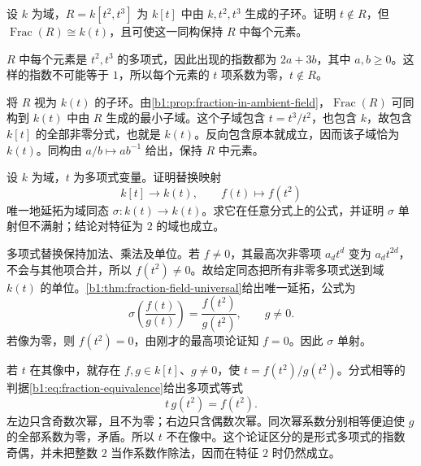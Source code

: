 \begin{exercise}\label{b1:ex:13-1}
	设 \(k\) 为域，\(R=k[t^2,t^3]\) 为 \(k[t]\) 中由 \(k,t^2,t^3\) 生成的子环。证明 \(t\notin R\)，但 \(\operatorname{Frac}(R)\cong k(t)\)，且可使这一同构保持 \(R\) 中每个元素。
\end{exercise}
\begin{solution}
	\(R\) 中每个元素是 \(t^2,t^3\) 的多项式，因此出现的指数都为 \(2a+3b\)，其中 \(a,b\geq0\)。这样的指数不可能等于 \(1\)，所以每个元素的 \(t\) 项系数为零，\(t\notin R\)。

	将 \(R\) 视为 \(k(t)\) 的子环。由\cref{b1:prop:fraction-in-ambient-field}，\(\operatorname{Frac}(R)\) 可同构到 \(k(t)\) 中由 \(R\) 生成的最小子域。这个子域包含 \(t=t^3/t^2\)，也包含 \(k\)，故包含 \(k[t]\) 的全部非零分式，也就是 \(k(t)\)。反向包含原本就成立，因而该子域恰为 \(k(t)\)。同构由 \(a/b\mapsto ab^{-1}\) 给出，保持 \(R\) 中元素。
\end{solution}

\begin{exercise}\label{b1:ex:13-9}
	设 \(k\) 为域，\(t\) 为多项式变量。证明替换映射
	\[
		k[t]\longrightarrow k(t),\qquad f(t)\longmapsto f(t^2)
	\]
	唯一地延拓为域同态 \(\sigma:k(t)\rightarrow k(t)\)。求它在任意分式上的公式，并证明 \(\sigma\) 单射但不满射；结论对特征为 \(2\) 的域也成立。
\end{exercise}
\begin{solution}
	多项式替换保持加法、乘法及单位。若 \(f\neq0\)，其最高次非零项 \(a_dt^d\) 变为 \(a_dt^{2d}\)，不会与其他项合并，所以 \(f(t^2)\neq0\)。故给定同态把所有非零多项式送到域 \(k(t)\) 的单位。\cref{b1:thm:fraction-field-universal}给出唯一延拓，公式为
	\[
		\sigma\left(\frac{f(t)}{g(t)}\right) =\frac{f(t^2)}{g(t^2)},\qquad g\neq0.
	\]
	若像为零，则 \(f(t^2)=0\)，由刚才的最高项论证知 \(f=0\)。因此 \(\sigma\) 单射。

	若 \(t\) 在其像中，就存在 \(f,g\in k[t]\)、\(g\neq0\)，使 \(t=f(t^2)/g(t^2)\)。分式相等的判据\eqref{b1:eq:fraction-equivalence}给出多项式等式
	\[
		t\,g(t^2)=f(t^2).
	\]
	左边只含奇数次幂，且不为零；右边只含偶数次幂。同次幂系数分别相等便迫使 \(g\) 的全部系数为零，矛盾。所以 \(t\) 不在像中。这个论证区分的是形式多项式的指数奇偶，并未把整数 \(2\) 当作系数作除法，因而在特征 \(2\) 时仍然成立。
\end{solution}

